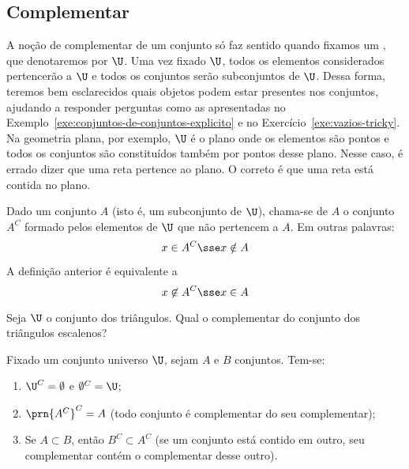 \subsection{Complementar}
A noção de complementar de um conjunto só faz sentido quando fixamos um , que denotaremos por $\U$.
Uma vez fixado $\U$, todos os elementos considerados pertencerão a $\U$ e todos os conjuntos serão subconjuntos de $\U$.
Dessa forma, teremos bem esclarecidos quais objetos podem estar presentes nos conjuntos, ajudando a responder perguntas como as apresentadas no Exemplo~\ref{exe:conjuntos-de-conjuntos-explicito} e no Exercício~\ref{exe:vazios-tricky}.
Na geometria plana, por exemplo, $\U$ é o plano onde os elementos são pontos e todos os conjuntos são constituídos também por pontos desse plano.
Nesse caso, é errado dizer que uma reta pertence ao plano.
O correto é que uma reta está contida no plano.

\begin{definition}[Complementar]
\label{def:complementar}
Dado um conjunto $A$ (isto é, um subconjunto de $\U$), chama-se  de $A$ o conjunto $A^C$ formado pelos elementos de $\U$ que não pertencem a $A$.
Em outras palavras:
$$
x \in A^C \sse x \notin A
$$
\end{definition}

\begin{remark}
A definição anterior é equivalente a
$$
x \not \in A^C \sse x \in A
$$
\end{remark}

\begin{example}
Seja $\U$ o conjunto dos triângulos.
Qual o complementar do conjunto dos triângulos escalenos?
\end{example}

\begin{proposition}
\label{prop-complementar}
Fixado um conjunto universo $\U$, sejam $A$ e $B$ conjuntos.
Tem-se:
%
\begin{enumerate}
	\item $\U^C=\emptyset$ e $\emptyset^C = \U$;
	\item $\prn{A^C}^C=A$ (todo conjunto é complementar do seu complementar);
	\item Se $A \subset B$, então $B^C \subset A^C$ (se um conjunto está contido em outro, seu complementar contém o complementar desse outro). 
\end{enumerate}
\end{proposition}

